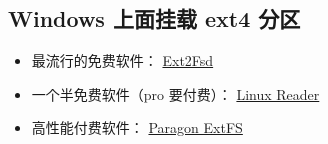 \subsection{Windows 上面挂载 ext4 分区}
\begin{itemize}
\item 最流行的免费软件： \href{https://sourceforge.net/projects/ext2fsd/}{Ext2Fsd}
\item 一个半免费软件（pro 要付费）： \href{https://www.diskinternals.com/linux-reader/}{Linux Reader}
\item 高性能付费软件： \href{https://www.paragon-software.com/business/extfs-for-windows/}{Paragon ExtFS}
\end{itemize}

